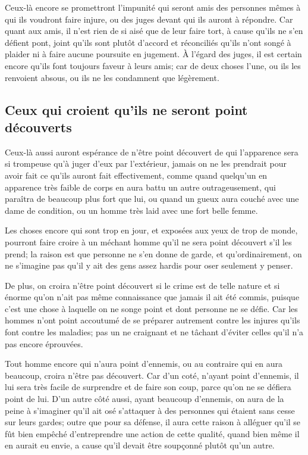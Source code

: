 Ceux-là encore se promettront l'impunité qui seront amis des personnes mêmes à qui ils voudront faire injure, ou
des juges devant qui ils auront à répondre. Car quant aux amis, il n'est rien de si aisé que de leur faire tort, à
cause qu'ils ne s'en défient pont, joint qu'ils sont plutôt d'accord et réconciliés qu'ils n'ont songé à plaider
ni à faire aucune poursuite en jugement. À l'égard des juges, il est certain encore qu'ils font toujours faveur à
leurs amis; car de deux choses l'une, ou ils les renvoient absous, ou ils ne les condamnent que légèrement.

\subsection{Ceux qui croient qu'ils ne seront point découverts}

Ceux-là aussi auront espérance de n'être point découvert de qui l'apparence sera si trompeuse qu'à juger d'eux par
l'extérieur, jamais on ne les prendrait pour avoir fait ce qu'ils auront fait effectivement, comme quand quelqu'un
en apparence très faible de corps en aura battu un autre outrageusement, qui paraîtra de beaucoup plus fort que lui,
ou quand un gueux aura couché avec une dame de condition, ou un homme très laid avec une fort belle femme. 

Les choses encore qui sont trop en jour, et exposées aux yeux de trop de monde, pourront faire croire à un
méchant homme qu'il ne sera point découvert s'il les prend; la raison est que personne ne s'en donne de garde,
et qu'ordinairement, on ne s'imagine pas qu'il y ait des gens assez hardis pour oser seulement y penser. 

De plus, on croira n'être point découvert si le crime est de telle nature et si énorme qu'on n'ait pas même
connaissance que jamais il ait été commis, puisque c'est une chose à laquelle on ne songe point et dont personne
ne se défie. Car les hommes n'ont point accoutumé de se préparer autrement contre les injures qu'ils font contre
les maladies; pas un ne craignant et ne tâchant d'éviter celles qu'il n'a pas encore éprouvées.

Tout homme encore qui n'aura point d'ennemis, ou au contraire qui en aura beaucoup, croira n'être pas découvert.
Car d'un coté, n'ayant point d'ennemis, il lui sera très facile de surprendre et de faire son coup, parce qu'on
ne se défiera point de lui. D'un autre côté aussi, ayant beaucoup d'ennemis, on aura de la peine à s'imaginer
qu'il ait osé s'attaquer à des personnes qui étaient sans cesse sur leurs gardes; outre que pour sa défense,
il aura cette raison à alléguer qu'il se fût bien empêché d'entreprendre une action de cette qualité, quand
bien même il en aurait eu envie, a cause qu'il devait être soupçonné plutôt qu'un autre.

